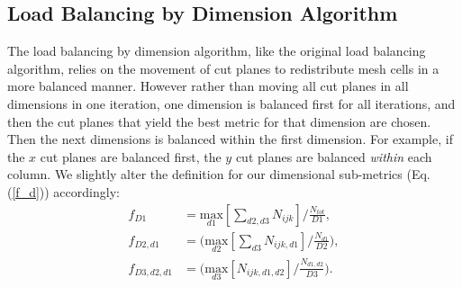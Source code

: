 \documentclass[letterpaper]{mandc2019}
\begin{document}
\subsection{Load Balancing by Dimension Algorithm}

The load balancing by dimension algorithm, like the original load balancing algorithm, relies on the movement of cut planes to redistribute mesh cells in a more balanced manner. However rather than moving all cut planes in all dimensions in one iteration, one dimension is balanced first for all iterations, and then the cut planes that yield the best metric for that dimension are chosen. Then the next dimensions is balanced within the first dimension. For example, if the $x$ cut planes are balanced first, the $y$ cut planes are balanced \textit{within} each column.
We slightly alter the definition for our dimensional sub-metrics (Eq. (\ref{f_d})) accordingly:
\begin{align}
f_{D1} &= \underset{d1}{\text{max}}[\sum_{d2,d3} N_{ijk}]/\frac{N_{tot}}{D1}, \label{f_d1} \\
f_{D2,d1} &= \Big(\underset{d2}{\text{max}}[\sum_{d3} N_{ijk,d1}]/\frac{N_{d1}}{D2}\Big), \label{f_d2}\\
f_{D3,d2,d1} &= \Big( \underset{d3}{\text{max}}[ N_{ijk,d1,d2}]/\frac{N_{d1,d2}}{D3} \Big) . \label{f_d3}
\end{align}
\end{document}

